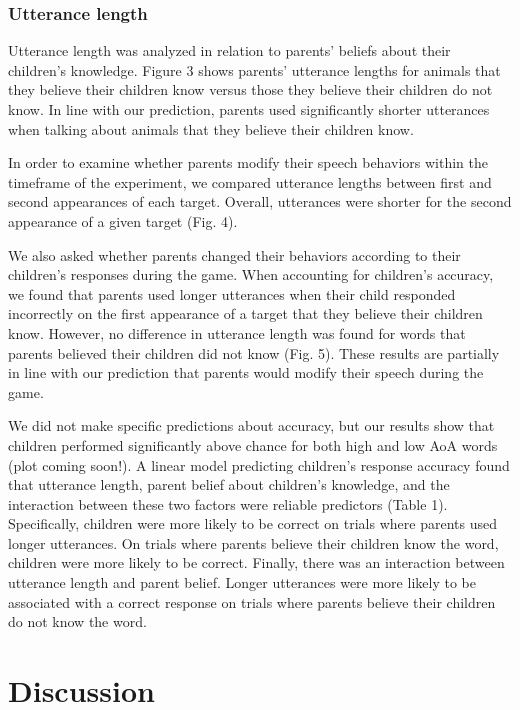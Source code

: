 \documentclass[10pt, letterpaper]{article}
\begin{document}
\hypertarget{utterance-length}{%
\subsubsection{Utterance length}\label{utterance-length}}

Utterance length was analyzed in relation to parents' beliefs about
their children's knowledge. Figure 3 shows parents' utterance lengths
for animals that they believe their children know versus those they
believe their children do not know. In line with our prediction, parents
used significantly shorter utterances when talking about animals that
they believe their children know.

In order to examine whether parents modify their speech behaviors within
the timeframe of the experiment, we compared utterance lengths between
first and second appearances of each target. Overall, utterances were
shorter for the second appearance of a given target (Fig. 4).

We also asked whether parents changed their behaviors according to their
children's responses during the game. When accounting for children's
accuracy, we found that parents used longer utterances when their child
responded incorrectly on the first appearance of a target that they
believe their children know. However, no difference in utterance length
was found for words that parents believed their children did not know
(Fig. 5). These results are partially in line with our prediction that
parents would modify their speech during the game.

We did not make specific predictions about accuracy, but our results
show that children performed significantly above chance for both high
and low AoA words (plot coming soon!). A linear model predicting
children's response accuracy found that utterance length, parent belief
about children's knowledge, and the interaction between these two
factors were reliable predictors (Table 1). Specifically, children were
more likely to be correct on trials where parents used longer
utterances. On trials where parents believe their children know the
word, children were more likely to be correct. Finally, there was an
interaction between utterance length and parent belief. Longer
utterances were more likely to be associated with a correct response on
trials where parents believe their children do not know the word.

\hypertarget{discussion}{%
\section{Discussion}\label{discussion}}
\end{document}
